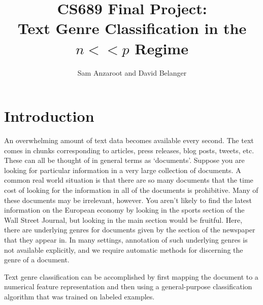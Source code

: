 \documentclass[]{article}
\begin{document}
\title{CS689 Final Project:\\ Text Genre Classification in the $n <<p$ Regime}
\author{Sam Anzaroot and David Belanger}
\maketitle
\section{Introduction}

An overwhelming amount of text data becomes available every second. The text comes in chunks corresponding to articles, press releases, blog posts, tweets, etc. These can all be thought of in general terms as `documents'. Suppose you are looking for particular information in a very large collection of documents. A common real world situation is that there are so many documents that the time cost of looking for the information in all of the documents is prohibitive. Many of these documents may be irrelevant, however. You aren't likely to find the latest information on the European economy by looking in the sports section of the Wall Street Journal, but looking in the main section would be fruitful. Here, there are underlying genres for documents given by the section of the newspaper that they appear in. In many settings, annotation of such underlying genres is not available explicitly, and we require automatic methods for discerning the genre of a document. 

Text genre classification can be accomplished by first mapping the document to a numerical feature representation and then using a general-purpose classification algorithm that was trained on labeled examples. 
\end{document}
